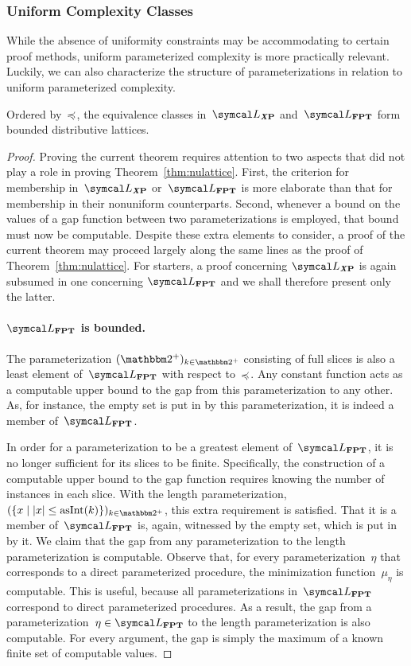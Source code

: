 \subsubsection{Uniform Complexity Classes}
While the absence of uniformity constraints may be accommodating to certain proof methods, uniform parameterized complexity is more practically relevant.
Luckily, we can also characterize the structure of parameterizations in relation to uniform parameterized complexity.
\begin{theorem}
\label{thm:lattice}%
  Ordered by~$\preccurlyeq$, the equivalence classes in~$\calL_\clX{P}$ and~$\calL_\cl{FPT}$ form bounded distributive lattices.
\end{theorem}
\begin{proof}
  Proving the current theorem requires attention to two aspects that did not play a role in proving  Theorem~\ref{thm:nulattice}.
  First, the criterion for membership in~$\calL_\clX{P}$ or~$\calL_\cl{FPT}$ is more elaborate than that for membership in their nonuniform counterparts.
  Second, whenever a bound on the values of a gap function between two parameterizations is employed, that bound must now be computable.
  Despite these extra elements to consider, a proof of the current theorem may proceed largely along the same lines as the proof of Theorem~\ref{thm:nulattice}.
  For starters, a proof concerning $\calL_\clX{P}$ is again subsumed in one concerning $\calL_\cl{FPT}$ and we shall therefore present only the latter.

  \paragraph{$\calL_\cl{FPT}$ is bounded.}
  The parameterization $(\binary^+)_{k \in \binary^+}$ consisting of full slices is also a least element of~$\calL_\cl{FPT}$ with respect to~$\preccurlyeq$.
  Any constant function acts as a computable upper bound to the gap from this parameterization to any other.
  As, for instance, the empty set is put in  by this parameterization, it is indeed a member of~$\calL_\cl{FPT}$.

  In order for a parameterization to be a greatest element of~$\calL_\cl{FPT}$, it is no longer sufficient for its slices to be finite.
  Specifically, the construction of a computable upper bound to the gap function requires knowing the number of instances in each slice.
  With the length parameterization, $(\{x \st \length{x} \le \asNat(k)\})_{k \in \binary^+}$, this extra requirement is satisfied.
  That it is a member of~$\calL_\cl{FPT}$ is, again, witnessed by the empty set, which is put in  by it.
  We claim that the gap from any parameterization to the length parameterization is computable.
  Observe that, for every parameterization~$\eta$ that corresponds to a direct parameterized procedure, the minimization function~$\mu_\eta$ is computable.
  This is useful, because all parameterizations in~$\calL_\cl{FPT}$ correspond to direct parameterized procedures.
  As a result, the gap from a parameterization~$\eta \in \calL_\cl{FPT}$ to the length parameterization is also computable.
  For every argument, the gap is simply the maximum of a known finite set of computable values.


\end{proof}
